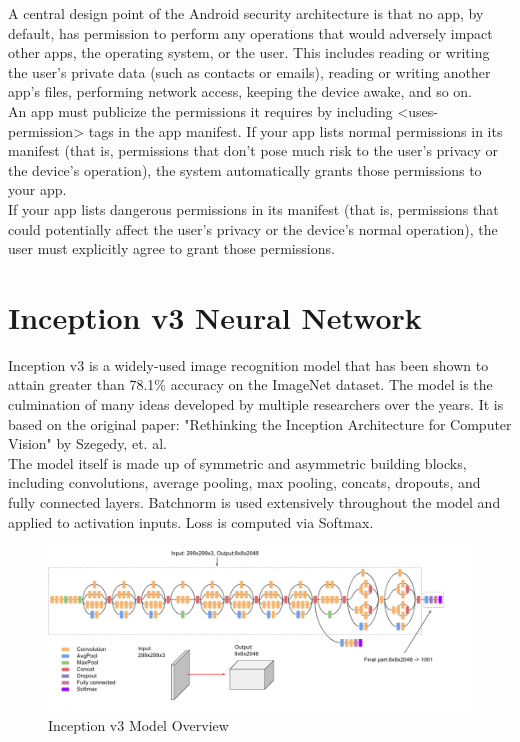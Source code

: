 \documentclass[14pt]{report}
\begin{document}
					A central design point of the Android security architecture is that no app, by default, has permission to perform any operations that would adversely impact other apps, the operating system, or the user. This includes reading or writing the user's private data (such as contacts or emails), reading or writing another app's files, performing network access, keeping the device awake, and so on.\\

					An app must publicize the permissions it requires by including <uses-permission> tags in the app manifest. If your app lists normal permissions in its manifest (that is, permissions that don't pose much risk to the user's privacy or the device's operation), the system automatically grants those permissions to your app.\\

					If your app lists dangerous permissions in its manifest (that is, permissions that could potentially affect the user's privacy or the device's normal operation), the user must explicitly agree to grant those permissions.
		\section{Inception v3 Neural Network}
			Inception v3 is a widely-used image recognition model that has been shown to attain greater than 78.1\% accuracy on the ImageNet dataset. The model is the culmination of many ideas developed by multiple researchers over the years. It is based on the original paper: "Rethinking the Inception Architecture for Computer Vision" by Szegedy, et. al.\\

			The model itself is made up of symmetric and asymmetric building blocks, including convolutions, average pooling, max pooling, concats, dropouts, and fully connected layers. Batchnorm is used extensively throughout the model and applied to activation inputs. Loss is computed via Softmax.\\
			\begin{figure}[h]
				\includegraphics[width=\textwidth]{inceptionover.png}
				\centering
				\caption{Inception v3 Model Overview}
				\label{fig:IncOver}
			\end{figure}
\end{document}
